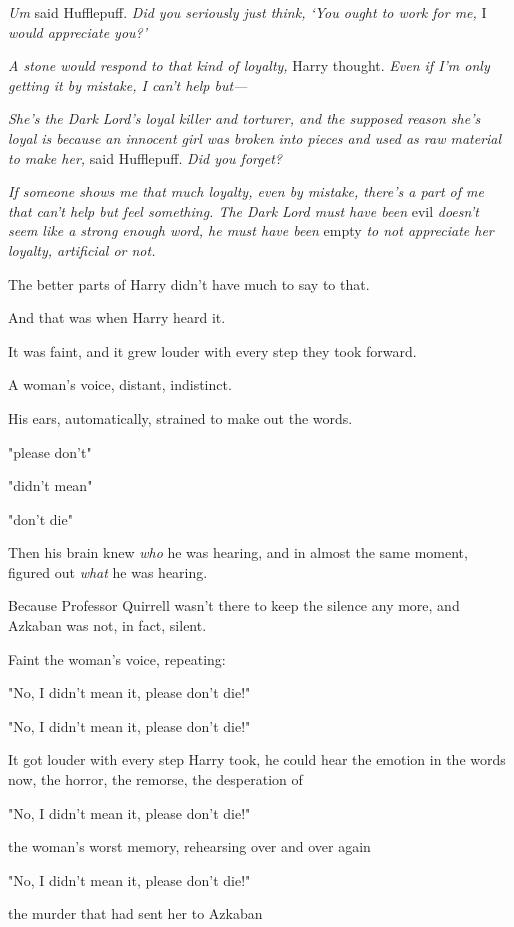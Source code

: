 \emph{Um{\el}} said Hufflepuff. \emph{Did you seriously just think, `You
ought to work for me,} I \emph{would appreciate you?'}

\emph{A stone would respond to that kind of loyalty,} Harry thought. \emph{Even
if I'm only getting it by mistake, I can't help but—}

\emph{She's the Dark Lord's loyal killer and torturer, and the supposed reason
she's loyal is because an innocent girl was broken into pieces and used as raw
material to make her,} said Hufflepuff. \emph{Did you forget?}

\emph{If someone shows me that much loyalty, even by mistake, there's a part of
me that can't help but feel something. The Dark Lord must have been{\el}}
evil \emph{doesn't seem like a strong enough word, he must have been}
empty\emph{{\el} to not appreciate her loyalty, artificial or not.}

The better parts of Harry didn't have much to say to that.

And that was when Harry heard it.

It was faint, and it grew louder with every step they took forward.

A woman's voice, distant, indistinct.

His ears, automatically, strained to make out the words.

"{\el}please don't{\el}"

"{\el}didn't mean{\el}"

"{\el}don't die{\el}"

Then his brain knew \emph{who} he was hearing, and in almost the same moment,
figured out \emph{what} he was hearing.

Because Professor Quirrell wasn't there to keep the silence any more, and
Azkaban was not, in fact, silent.

Faint the woman's voice, repeating:

"No, I didn't mean it, please don't die!"

"No, I didn't mean it, please don't die!"

It got louder with every step Harry took, he could hear the emotion in the
words now, the horror, the remorse, the desperation of{\el}

"No, I didn't mean it, please don't die!"

{\el} the woman's worst memory, rehearsing over and over again{\el}

"No, I didn't mean it, please don't die!"

{\el} the murder that had sent her to Azkaban{\el}

